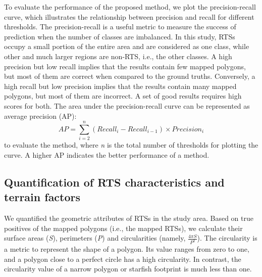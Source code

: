 \documentclass[preprint,12pt,authoryear]{elsarticle}
\begin{document}
To evaluate the performance of the proposed method, we plot the precision-recall curve, which illustrates the relationship between precision and recall for different thresholds. The precision-recall is a useful metric to measure the success of prediction when the number of classes are imbalanced. In this study, RTSs occupy a small portion of the entire area and are considered as one class, while other and much larger regions are non-RTS, i.e., the other classes. A high precision but low recall implies that the results contain few mapped polygons, but most of them are correct when compared to the ground truths. Conversely, a high recall but low precision implies that the results contain many mapped polygons, but most of them are incorrect. A set of good results requires high scores for both. The area under the precision-recall curve can be represented as average precision (AP):
\begin{equation}
AP=\sum_{i=2}^{n} (Recall_i - Recall_{i-1})\times Precision_i 
\label{equ_ap}
\end{equation}
to evaluate the method, where \emph{n} is the total number of thresholds for plotting the curve. A higher AP indicates the better performance of a method.


\subsection{Quantification of RTS characteristics and terrain factors}
\label{subsec_quantify_rts}

We quantified the geometric attributes of RTSs in the study area. Based on true positives of the mapped polygons (i.e., the mapped RTSs), we calculate their surface areas (\emph{S}), perimeters (\emph{P}) and circularities (namely, $\frac{4 \pi S}{P^2} $). The circularity is a metric to represent the shape of a polygon. Its value ranges from zero to one, and a polygon close to a perfect circle has a high circularity. In contrast, the circularity value of a narrow polygon or starfish footprint is much less than one. 
\end{document}
